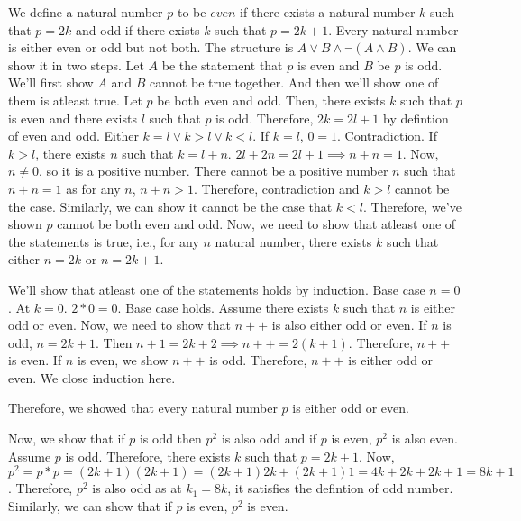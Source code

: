 \documentclass{report}
\begin{document}
We define a natural number $p$ to be $even$ if there exists a natural number $k$ such that $p=2k$ and odd if  there exists  $k$ such that  $p=2k+1$. Every natural number is either even or odd but not both. The structure is $A \lor B \land \lnot \left( A \land B \right) $. We can show it in two steps. Let $A$ be the statement that  $p$ is even and  $B$ be $p$ is odd. We'll first show $A$ and $B$ cannot be true together. And then we'll show one of them is atleast true. Let $p$ be both even and odd. Then, there exists $k$ such that $p$ is even and there exists $l$ such that  $p$ is odd. Therefore, $2k = 2l + 1$ by defintion of even and odd. Either $k=l \lor k > l \lor k < l$. If $k=l$,  $0 = 1$. Contradiction.  If  $k > l$, there exists  $n$ such that  $k = l + n$.  $2l + 2n = 2l + 1 \implies n + n = 1$. Now,  $n \ne 0$, so it is a positive number. There cannot be a positive number  $n$ such that  $n+n = 1$ as for any  $n$,  $n+n > 1$. Therefore, contradiction and  $k > l$ cannot be the case. Similarly, we can show it cannot be the case that  $k < l$. Therefore, we've shown $p$ cannot be both even and odd. Now, we need to show that atleast one of the statements is true, i.e., for any $n$ natural number, there exists  $k$ such that either  $n = 2k$ or  $n = 2k + 1$.

We'll show that atleast one of the statements holds by induction. Base case $n = 0$.  At $k=0$. $2*0 = 0$. Base case holds. Assume there exists $k$ such that  $n$ is either odd or even. Now, we need to show that  $n++$ is also either odd or even. If $n$ is odd,  $n=2k + 1$. Then  $n+1= 2k+2 \implies n++=2(k+1)$. Therefore,  $n++$ is even. If $n$ is even, we show  $n++$ is odd. Therefore, $n++$ is either odd or even. We close induction here.

Therefore, we showed that every natural number $p$ is either odd or even.

Now, we show that if $p$ is odd then $p^2$ is also odd and if $p$ is even, $p^2$ is also even.
Assume $p$ is odd. Therefore, there exists  $k$ such that $p = 2k+1$. Now,  $p^2 = p*p = (2k+1)(2k+1) = (2k+1)2k + (2k+1)1 = 4k + 2k + 2k + 1 = 8k+1$. Therefore,  $p^2$ is also odd as at  $k_1 = 8k$, it satisfies the defintion of odd number. Similarly, we can show that if  $p$ is even, $p^2$ is even. 
\end{document}
